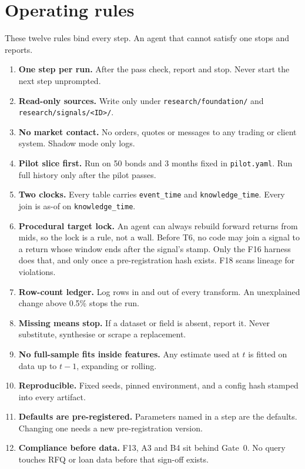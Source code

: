 \documentclass[11pt,letterpaper]{article}
\newcommand{\code}[1]{\texttt{#1}}
\begin{document}
\section{Operating rules}
\label{sec:rules}
These twelve rules bind every step. An agent that cannot satisfy one stops and reports.
\begin{enumerate}[itemsep=2pt]
\item \textbf{One step per run.} After the pass check, report and stop. Never start the next step unprompted.
\item \textbf{Read-only sources.} Write only under \code{research/\allowbreak foundation/} and \code{research/\allowbreak signals/\allowbreak <ID>/}.
\item \textbf{No market contact.} No orders, quotes or messages to any trading or client system. Shadow mode only logs.
\item \textbf{Pilot slice first.} Run on 50 bonds and 3 months fixed in \code{pilot.yaml}. Run full history only after the pilot passes.
\item \textbf{Two clocks.} Every table carries \code{event_time} and \code{knowledge_time}. Every join is as-of on \code{knowledge_time}.
\item \textbf{Procedural target lock.} An agent can always rebuild forward returns from mids, so the lock is a rule, not a wall. Before T6, no code may join a signal to a return whose window ends after the signal's stamp. Only the F16 harness does that, and only once a pre-registration hash exists. F18 scans lineage for violations.
\item \textbf{Row-count ledger.} Log rows in and out of every transform. An unexplained change above 0.5\% stops the run.
\item \textbf{Missing means stop.} If a dataset or field is absent, report it. Never substitute, synthesise or scrape a replacement.
\item \textbf{No full-sample fits inside features.} Any estimate used at $t$ is fitted on data up to $t-1$, expanding or rolling.
\item \textbf{Reproducible.} Fixed seeds, pinned environment, and a config hash stamped into every artifact.
\item \textbf{Defaults are pre-registered.} Parameters named in a step are the defaults. Changing one needs a new pre-registration version.
\item \textbf{Compliance before data.} F13, A3 and B4 sit behind Gate~0. No query touches RFQ or loan data before that sign-off exists.
\end{enumerate}
\end{document}
